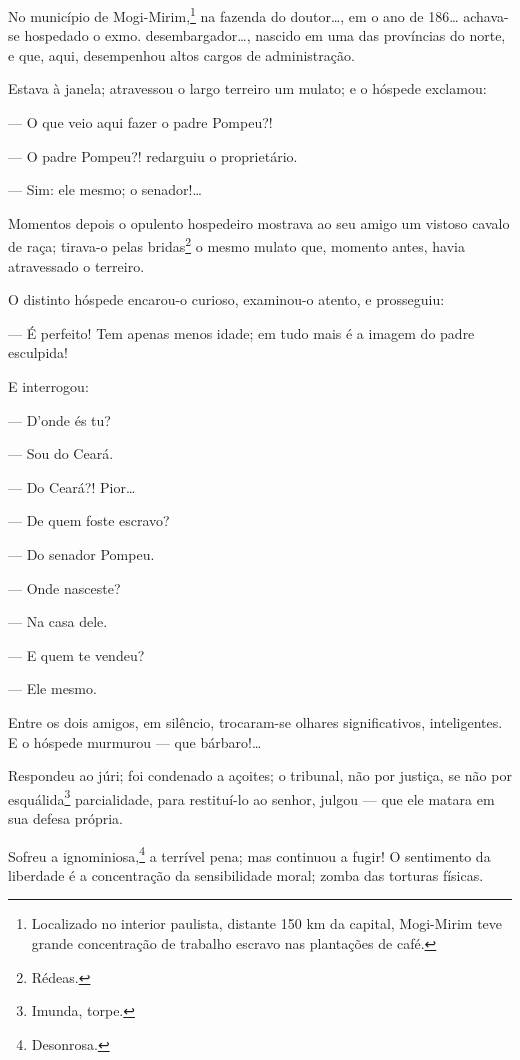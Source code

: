\asterisc

No município de Mogi-Mirim,\footnote{Localizado no interior paulista,
  distante 150 km da capital, Mogi-Mirim teve grande concentração de
  trabalho escravo nas plantações de café.} na fazenda do doutor\ldots{}, em
o ano de 186\ldots{} achava-se hospedado o exmo. desembargador\ldots{}, nascido em
uma das províncias do norte, e que, aqui, desempenhou altos cargos de
administração.

Estava à janela; atravessou o largo terreiro um mulato; e o hóspede
exclamou:

--- O que veio aqui fazer o padre Pompeu?!

--- O padre Pompeu?! redarguiu o proprietário.

--- Sim: ele mesmo; o senador!\ldots{}

Momentos depois o opulento hospedeiro mostrava ao seu amigo um vistoso
  cavalo de raça; tirava-o pelas bridas\footnote{Rédeas.} o mesmo
  mulato que, momento antes, havia atravessado o terreiro.

  O distinto hóspede encarou-o curioso, examinou-o atento, e prosseguiu:

--- É perfeito! Tem apenas menos idade; em tudo mais é a imagem do
padre esculpida!

E interrogou:

  --- D'onde és tu?

  --- Sou do Ceará.

  --- Do Ceará?! Pior\ldots{}

  --- De quem foste escravo?

  --- Do senador Pompeu.

  --- Onde nasceste?

  --- Na casa dele.

  --- E quem te vendeu?

  --- Ele mesmo.

  Entre os dois amigos, em silêncio, trocaram-se olhares significativos,
  inteligentes. E o hóspede murmurou --- que bárbaro!\ldots{}

  Respondeu ao júri; foi condenado a açoites; o tribunal, não por
    justiça, se não por esquálida\footnote{Imunda, torpe.} parcialidade,
    para restituí-lo ao senhor, julgou --- que ele matara em sua defesa
    própria.

  Sofreu a ignominiosa,\footnote{Desonrosa.} a terrível pena; mas
  continuou a fugir! O sentimento da liberdade é a concentração da
  sensibilidade moral; zomba das torturas físicas.


